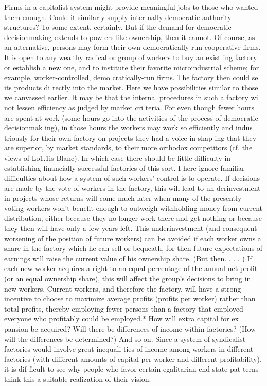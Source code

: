 \documentclass[11pt,openany]{book}
\begin{document}
Firms in a capitalist system might provide meaningful jobs to those who wanted them enough. Could it similarly supply inter nally democratic authority structures? To some extent, certainly. But if the demand for democratic decisionmaking extends to pow ers like ownership, then it cannot. Of course, as an alternative, persons may form their own democratically-run cooperative firms. It is open to any wealthy radical or group of workers to buy an exist ing factory or establish a new one, and to institute their favorite microindustrial scheme; for example, worker-controlled, demo cratically-run firms. The factory then could sell its products di rectly into the market. Here we have possibilities similar to those we canvassed earlier. It may be that the internal procedures in such a factory will not lessen efficiency as judged by market cri teria. For even though fewer hours are spent at work (some hours go into the activities of the process of democratic decisionmak ing), in those hours the workers may work so efficiently and indus triously for their own factory on projects they had a voice in shap ing that they are superior, by market standards, to their more orthodox competitors (cf. the views of Lo1.1is Blanc). In which case there should be little difficulty in establishing financially successful factories of this sort. I here ignore familiar difficulties about how a system of such workers' control is to operate. If decisions are made by the vote of workers in the factory, this will lead to un derinvestment in projects whose returns will come much later when many of the presently voting workers won't benefit enough to outweigh withholding money from current distribution, either because they no longer work there and get nothing or because they then will have only a few years left. This underinvestment (and consequent worsening of the position of future workers) can be avoided if each worker owns a share in the factory which he can sell or bequeath, for then future expectations of earnings will raise the current value of his ownership share. (But then. . . . ) If each new worker acquires a right to an equal percentage of the annual net profit (or an equal ownership share), this will affect the group's decisions to bring in new workers. Current workers, and therefore the factory, will have a strong incentive to choose to maximize average profits (profits per worker) rather than total profits, thereby employing fewer persons than a factory that employed everyone who profitably could be employed.* How will extra capital for ex pansion be acquired? Will there be differences of income within factories? (How will the differences be determined?) And so on. Since a system of syndicalist factories would involve great inequali ties of income among workers in different factories (with different amounts of capital per worker and different profitability), it is dif ficult to see why people who favor certain egalitarian end-state pat terns think this a suitable realization of their vision. 
\end{document}
